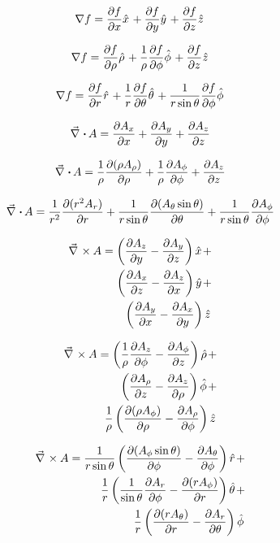 \documentclass[a4paper,10pt]{article}
\begin{document}
\begin{multicols}{2}
  \begin{equation*}
    \grad f = \dep{f}{x} \hat{x} +
    \dep{f}{y} \hat{y} +
    \dep{f}{z} \hat{z}
  \end{equation*}
  
  \begin{equation*}
    \grad f = \dep{f}{\rho} \hat{\rho} +
    \frac{1}{\rho} \dep{f}{\phi} \hat{\phi} +
    \dep{f}{z} \hat{z}
  \end{equation*}
  
  \begin{equation*}
    \grad f = \dep{f}{r} \hat{r} +
    \frac{1}{r} \dep{f}{\theta} \hat{\theta} +
    \frac{1}{r \sin \theta} \dep{f}{\phi} \hat{\phi}
  \end{equation*}
  
  \begin{equation*}
    \div A = \dep{A_x}{x} + \dep{A_y}{y} + \dep{A_z}{z}
  \end{equation*}
  
  \begin{equation*}
    \div A = \frac{1}{\rho} \dep{(\rho A_\rho)}{\rho} +
    \frac{1}{\rho} \dep{A_\phi}{\phi} +
    \dep{A_z}{z}
  \end{equation*}
  
  \begin{equation*}
    \div A = \frac{1}{r^2} \dep{(r^2 A_r)}{r} +
    \frac{1}{r \sin \theta} \dep{(A_\theta \sin\theta)}{\theta} +
    \frac{1}{r \sin\theta} \dep{A_\phi}{\phi}
  \end{equation*}

\begin{align*}
  \rot A = \lrb{\dep{A_z}{y} - \dep{A_y}{z}} \hat{x} + \\
  \lrb{\dep{A_x}{z} - \dep{A_z}{x}} \hat{y} + \\
  \lrb{\dep{A_y}{x} - \dep{A_x}{y}} \hat{z}
\end{align*}

\begin{align*}
  \rot A = \lrb{\frac{1}{\rho} \dep{A_z}{\phi} - \dep{A_\phi}{z}} \hat{\rho} + \\
  \lrb{\dep{A_\rho}{z} - \dep{A_z}{\rho}} \hat{\phi} + \\
  \frac{1}{\rho} \lrb{\dep{(\rho A_\phi)}{\rho} - \dep{A_\rho}{\phi}} \hat{z}
\end{align*}

\begin{align*}
  \rot A = \frac{1}{r \sin\theta} \lrb{\dep{(A_\phi \sin\theta)}{\phi} - \dep{A_\theta}{\phi}} \hat{r} + \\
  \frac{1}{r} \lrb{\frac{1}{\sin\theta} \dep{A_r}{\phi} - \dep{(r A_\phi)}{r}} \hat{\theta} + \\
  \frac{1}{r} \lrb{\dep{(r A_\theta)}{r} - \dep{A_r}{\theta}} \hat{\phi}
\end{align*}
\end{multicols}
\end{document}

